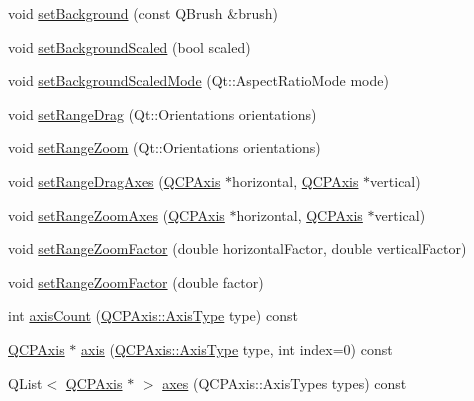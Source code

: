 \begin{DoxyCompactItemize}
\item 
void \mbox{\hyperlink{class_q_c_p_axis_rect_a22a22b8668735438dc06f9a55fe46b33}{set\+Background}} (const Q\+Brush \&brush)
\item 
void \mbox{\hyperlink{class_q_c_p_axis_rect_ae6d36c3e0e968ffb991170a018e7b503}{set\+Background\+Scaled}} (bool scaled)
\item 
void \mbox{\hyperlink{class_q_c_p_axis_rect_a5ef77ea829c9de7ba248e473f48f7305}{set\+Background\+Scaled\+Mode}} (Qt\+::\+Aspect\+Ratio\+Mode mode)
\item 
void \mbox{\hyperlink{class_q_c_p_axis_rect_ae6aef2f7211ba6097c925dcd26008418}{set\+Range\+Drag}} (Qt\+::\+Orientations orientations)
\item 
void \mbox{\hyperlink{class_q_c_p_axis_rect_a7960a9d222f1c31d558b064b60f86a31}{set\+Range\+Zoom}} (Qt\+::\+Orientations orientations)
\item 
void \mbox{\hyperlink{class_q_c_p_axis_rect_a648cce336bd99daac4a5ca3e5743775d}{set\+Range\+Drag\+Axes}} (\mbox{\hyperlink{class_q_c_p_axis}{Q\+C\+P\+Axis}} $\ast$horizontal, \mbox{\hyperlink{class_q_c_p_axis}{Q\+C\+P\+Axis}} $\ast$vertical)
\item 
void \mbox{\hyperlink{class_q_c_p_axis_rect_a9442cca2aa358405f39a64d51eca13d2}{set\+Range\+Zoom\+Axes}} (\mbox{\hyperlink{class_q_c_p_axis}{Q\+C\+P\+Axis}} $\ast$horizontal, \mbox{\hyperlink{class_q_c_p_axis}{Q\+C\+P\+Axis}} $\ast$vertical)
\item 
void \mbox{\hyperlink{class_q_c_p_axis_rect_a895d7ac745ea614e04056244b3c138ac}{set\+Range\+Zoom\+Factor}} (double horizontal\+Factor, double vertical\+Factor)
\item 
void \mbox{\hyperlink{class_q_c_p_axis_rect_ae83d187b03fc6fa4f00765ad50cd3fc3}{set\+Range\+Zoom\+Factor}} (double factor)
\item 
int \mbox{\hyperlink{class_q_c_p_axis_rect_a85b321acec0f694d8b5fdeafdbff3133}{axis\+Count}} (\mbox{\hyperlink{class_q_c_p_axis_ae2bcc1728b382f10f064612b368bc18a}{Q\+C\+P\+Axis\+::\+Axis\+Type}} type) const
\item 
\mbox{\hyperlink{class_q_c_p_axis}{Q\+C\+P\+Axis}} $\ast$ \mbox{\hyperlink{class_q_c_p_axis_rect_a583ae4f6d78b601b732183f6cabecbe1}{axis}} (\mbox{\hyperlink{class_q_c_p_axis_ae2bcc1728b382f10f064612b368bc18a}{Q\+C\+P\+Axis\+::\+Axis\+Type}} type, int index=0) const
\item 
Q\+List$<$ \mbox{\hyperlink{class_q_c_p_axis}{Q\+C\+P\+Axis}} $\ast$ $>$ \mbox{\hyperlink{class_q_c_p_axis_rect_a8db4722cb93e9c4a6f0d91150c200867}{axes}} (Q\+C\+P\+Axis\+::\+Axis\+Types types) const

\end{DoxyCompactItemize}
